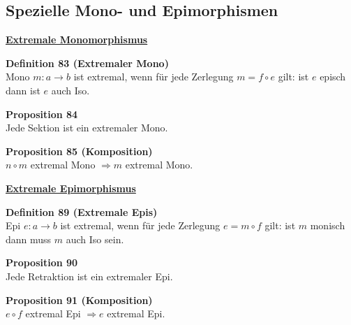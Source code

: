 \subsection{Spezielle Mono- und Epimorphismen}

\begin{multicols}{2}{}

\textbf{\underline{Extremale Monomorphismus}}

\textbf{Definition 83 (Extremaler Mono)} \\
Mono $m: a \rightarrow b$ ist extremal, wenn für jede Zerlegung $m = f \circ e$
gilt: ist $e$ episch dann ist $e$ auch Iso.

\textbf{Proposition 84 } \\
Jede Sektion ist ein extremaler Mono.

\textbf{Proposition 85 (Komposition)} \\
$n \circ m$ extremal Mono $\Rightarrow m$ extremal Mono.


\columnbreak
\textbf{\underline{Extremale Epimorphismus}}

\textbf{Definition 89 (Extremale Epis)} \\
Epi $e: a \rightarrow b$ ist extremal, wenn für jede Zerlegung $e = m \circ f$
gilt: ist $m$ monisch dann muss $m$ auch Iso sein.

\textbf{Proposition 90 } \\
Jede Retraktion ist ein extremaler Epi.

\textbf{Proposition 91 (Komposition)} \\
$e \circ f$ extremal Epi $\Rightarrow e$ extremal Epi.


\end{multicols}

\newpage

